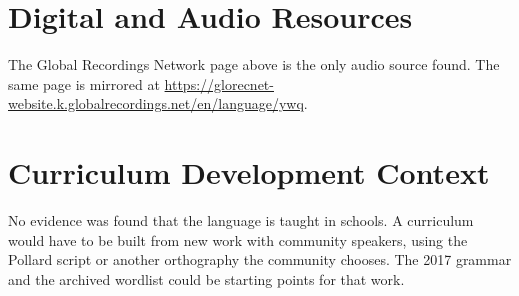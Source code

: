 \documentclass[12pt]{article}
\begin{document}
\section{Digital and Audio Resources}
The Global Recordings Network page above is the only audio source found. The same page is mirrored at \url{https://glorecnet-website.k.globalrecordings.net/en/language/ywq}.

\section{Curriculum Development Context}
No evidence was found that the language is taught in schools. A curriculum would have to be built from new work with community speakers, using the Pollard script or another orthography the community chooses. The 2017 grammar and the archived wordlist could be starting points for that work.
\end{document}
